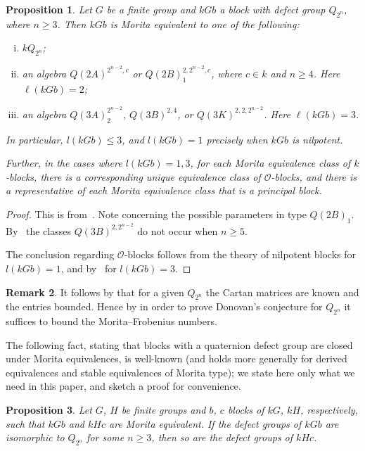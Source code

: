 \documentclass{amsart}
\theoremstyle{plain}\newtheorem{Theorem}{Theorem}[section]
\theoremstyle{plain}\newtheorem{Conjecture}[Theorem]{Conjecture}
\theoremstyle{plain}\newtheorem{Corollary}[Theorem]{Corollary}
\theoremstyle{plain}\newtheorem{Lemma}[Theorem]{Lemma}
\theoremstyle{plain}\newtheorem{Proposition}[Theorem]{Proposition}
\theoremstyle{definition}\newtheorem{Definition}[Theorem]{Definition}
\theoremstyle{definition}\newtheorem{Example}[Theorem]{Example}
\theoremstyle{definition}\newtheorem{Examples}[Theorem]{Examples}
\theoremstyle{definition}\newtheorem{Exercise}[Theorem]{Exercise}
\theoremstyle{definition}\newtheorem{Notation}[Theorem]{Notation}
\theoremstyle{definition}\newtheorem{Remark}[Theorem]{Remark}
\theoremstyle{definition}\newtheorem{Remarks}[Theorem]{Remarks}
\def\CO{{\mathcal{O}}}    \def\OPE{{\mathcal{O}(P\rtimes E)}}
\numberwithin{equation}{section}
\begin{document}
\begin{Proposition}
Let $G$ be a finite group and $kG b$ a block with defect group $Q_{2^n}$, 
where $n \geq 3$. Then $kGb$ is Morita equivalent to one of the following:
\begin{enumerate}[(i)]
\item $kQ_{2^n}$;
\item an algebra $Q(2A)^{2^{n-2},c}$ or $Q(2B)_1^{2,2^{n-2},c}$, where $c \in k$ and $n \geq 4$. Here $\ell(kGb)=2$;
\item an algebra $Q(3A)_2^{2^{n-2}}$, $Q(3B)^{2,4}$, or $Q(3K)^{2,2,2^{n-2}}$. Here $\ell(kGb)=3$.
\end{enumerate}

In particular, $l(kGb) \leq 3$, and $l(kGb)=1$ precisely when $kGb$ is nilpotent.

Further, in the cases where $l(kGb)=1,3$, for each Morita equivalence class of $k$-blocks, there is a corresponding unique equivalence class of $\CO$-blocks, and there is a representative of each Morita equivalence class that is a principal block.
\end{Proposition}

\begin{proof}
This is from~\cite{er90}. Note  concerning the possible parameters in type $Q(2B)_1$. By~\cite{Macgregor} the classes $Q(3B)^{2,2^{n-2}}$ do not occur when $n \geq 5$.

The conclusion regarding $\CO$-blocks follows from the theory of nilpotent blocks for $l(kGb)=1$, and by~\cite{Eisele16} for $l(kGb)=3$.
\end{proof}

\begin{Remark}\label{rem:mfbound}
    It follows by  that for a given $Q_{2^n}$ the Cartan matrices are known and the entries bounded. Hence by  in order to prove Donovan's conjecture for $Q_{2^n}$ it suffices to bound the Morita--Frobenius numbers.
\end{Remark}

The following fact, stating that blocks with a quaternion defect group
are closed under Morita equivalences, is well-known (and holds more
generally for derived equivalences and stable equivalences of Morita type);
we state here only what we need in this paper, and sketch
a proof for convenience.

\begin{Proposition} 
Let $G$, $H$ be finite groups and $b$, $c$ blocks of $kG$, $kH$,
respectively, such that $kGb$ and $kHc$ are Morita equivalent.
If the defect groups of $kGb$ are isomorphic to $Q_{2^n}$ for some
$n\geq 3$, then so are the defect groups of $kHc$.
\end{Proposition}
\end{document}
